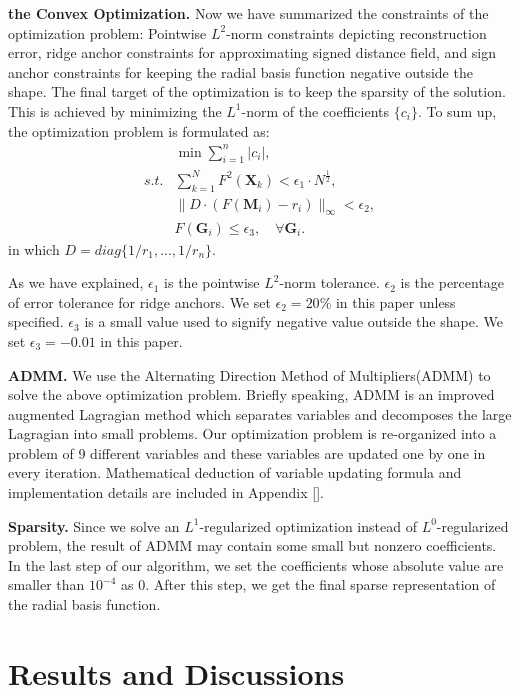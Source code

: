 \documentclass[annual]{acmsiggraph}
\begin{document}
\textbf{the Convex Optimization. } Now we have summarized the constraints of the optimization problem: Pointwise $L^2$-norm constraints depicting reconstruction error, ridge anchor constraints for approximating signed distance field, and sign anchor constraints for keeping the radial basis function negative outside the shape. The final target of the optimization is to keep the sparsity of the solution. This is achieved by minimizing the $L^1$-norm of the coefficients $\{c_i\}$. To sum up, the optimization problem is formulated as:
\begin{align}
&\min\sum_{i=1}^n|c_i|,\\
s.t. &\sum_{k=1}^N F^2(\mathbf{X}_k)<\epsilon_1\cdot N^{\frac{1}{2}},\\
&\|D\cdot(F(\mathbf{M}_i)-r_i)\|_{\infty}<\epsilon_2,\\
& F(\mathbf{G}_i) \le \epsilon_3, \quad\forall \mathbf{G}_i.
\end{align}
in which $D=diag\{1/r_1,...,1/r_n\}$.

As we have explained, $\epsilon_1$ is the pointwise $L^2$-norm tolerance. $\epsilon_2$ is the percentage of error tolerance for ridge anchors. We set $\epsilon_2=20\%$ in this paper unless specified. $\epsilon_3$ is a small value used to signify negative value outside the shape. We set $\epsilon_3=-0.01$ in this paper.

\textbf{ADMM. }
We use the Alternating Direction Method of Multipliers(ADMM) to solve the above optimization problem. Briefly speaking, ADMM is an improved augmented Lagragian method which separates variables and decomposes the large Lagragian into small problems. Our optimization problem is re-organized into a problem of 9 different variables and these variables are updated one by one in every iteration. Mathematical deduction of variable updating formula and implementation details are included in Appendix [].

\textbf{Sparsity. }
Since we solve an $L^1$-regularized optimization instead of $L^0$-regularized problem, the result of ADMM may contain some small but nonzero coefficients. In the last step of our algorithm, we set the coefficients whose absolute value are smaller than $10^{-4}$ as 0. After this step, we get the final sparse representation of the radial basis function.

\section{Results and Discussions}
~\cite{Chen:2009:ABF}
\end{document}
